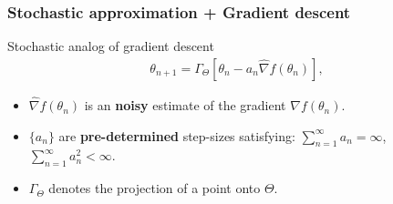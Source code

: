 \begin{frame}
\begin{small}
\frametitle{\centering  Stochastic approximation + Gradient descent}
\begin{block}{Stochastic analog of gradient descent}
\begin{align}\label{saalg}
\theta_{n+1} = \Gamma_{\Theta} \left [\theta_{n} - a_{n} \widehat{\nabla} f(\theta_{n}) \right],
\end{align}

\begin{itemize}
\item $ \widehat{\nabla} f(\theta_{n})$ is an \textbf{noisy} estimate of the gradient $ {\nabla} f(\theta_{n})$.
\item $\{a_{n}\}$ are  \textbf{pre-determined} step-sizes satisfying: $\sum_{n=1}^{\infty} a_{n}  = \infty$,  $\sum_{n = 1}^{\infty} a_{n}^{2} < \infty$.
\item $\Gamma_{\Theta}$ denotes the projection of a point  onto $\Theta$.
\end{itemize}
\end{block}
\end{small}
\end{frame}



